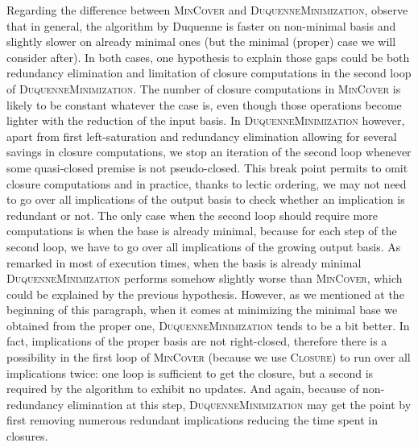 Regarding the difference between \textsc{MinCover} and \textsc{DuquenneMinimization}, observe that in general, the algorithm by Duquenne is faster on non-minimal basis and slightly slower on already minimal ones (but the minimal (proper) case we will consider after). In both cases, one hypothesis to explain those gaps could be both redundancy elimination and limitation of closure computations in the second loop of \textsc{DuquenneMinimization}. The number of closure computations in \textsc{MinCover} is likely to be constant whatever the case is, even though
those operations become lighter with the reduction of the input basis. In \textsc{DuquenneMinimization} however, apart from first left-saturation and
redundancy elimination allowing for several savings in closure computations, we stop an iteration of the second loop whenever some quasi-closed premise is not
pseudo-closed. This break point permits to omit closure computations and in practice, thanks to lectic ordering, we may not need to go over all implications of the output basis to check whether an implication is redundant or not. The only case when the second loop should require more computations is when the base is already minimal, because for each step of the second loop, we have to go over all implications of the growing output basis. As remarked in most of execution times, when the basis is already minimal \textsc{DuquenneMinimization} performs somehow slightly worse than 
\textsc{MinCover}, which could be explained by the previous hypothesis. However,
as we mentioned at the beginning of this paragraph, when it comes at minimizing
the minimal base we obtained from the proper one, \textsc{DuquenneMinimization}
tends to be a bit better. In fact, implications of the proper basis are not
right-closed, therefore there is a possibility in the first loop of \textsc{MinCover} (because we use \textsc{Closure}) to run over all implications
twice: one loop is sufficient to get the closure, but a second is required by the algorithm to exhibit no updates. And again, because of non-redundancy elimination at this step, \textsc{DuquenneMinimization} may get the point by first removing numerous redundant implications reducing the time spent in closures.

\vspace{1.2em}



